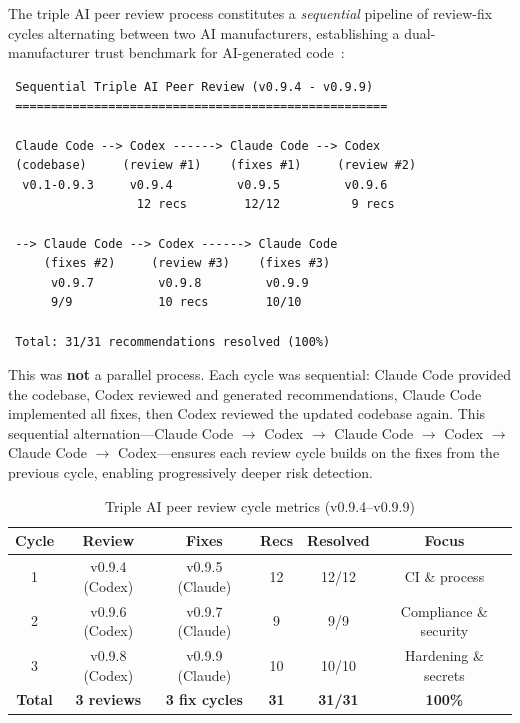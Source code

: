 The triple AI peer review process constitutes a \emph{sequential} pipeline of review-fix cycles alternating between two AI manufacturers, establishing a dual-manufacturer trust benchmark for AI-generated code~\cite{kawchak2026peerreview}:

\begin{verbatim}
 Sequential Triple AI Peer Review (v0.9.4 - v0.9.9)
 ====================================================

 Claude Code --> Codex ------> Claude Code --> Codex
 (codebase)     (review #1)    (fixes #1)     (review #2)
  v0.1-0.9.3     v0.9.4         v0.9.5         v0.9.6
                  12 recs        12/12          9 recs

 --> Claude Code --> Codex ------> Claude Code
     (fixes #2)     (review #3)    (fixes #3)
      v0.9.7         v0.9.8         v0.9.9
      9/9            10 recs        10/10

 Total: 31/31 recommendations resolved (100%)
\end{verbatim}

This was \textbf{not} a parallel process. Each cycle was sequential: Claude Code provided the codebase, Codex reviewed and generated recommendations, Claude Code implemented all fixes, then Codex reviewed the updated codebase again. This sequential alternation---Claude Code $\to$ Codex $\to$ Claude Code $\to$ Codex $\to$ Claude Code $\to$ Codex---ensures each review cycle builds on the fixes from the previous cycle, enabling progressively deeper risk detection.

\begin{table}[H]
\centering
\caption{Triple AI peer review cycle metrics (v0.9.4--v0.9.9)}
\label{tab:peerreview}
\small
\begin{tabular}{@{}cccccc@{}}
\toprule
\textbf{Cycle} & \textbf{Review} & \textbf{Fixes} & \textbf{Recs} & \textbf{Resolved} & \textbf{Focus} \\
\midrule
1 & v0.9.4 (Codex) & v0.9.5 (Claude) & 12 & 12/12 & CI \& process \\
2 & v0.9.6 (Codex) & v0.9.7 (Claude) & 9 & 9/9 & Compliance \& security \\
3 & v0.9.8 (Codex) & v0.9.9 (Claude) & 10 & 10/10 & Hardening \& secrets \\
\midrule
\textbf{Total} & \textbf{3 reviews} & \textbf{3 fix cycles} & \textbf{31} & \textbf{31/31} & \textbf{100\%} \\
\bottomrule
\end{tabular}
\end{table}

